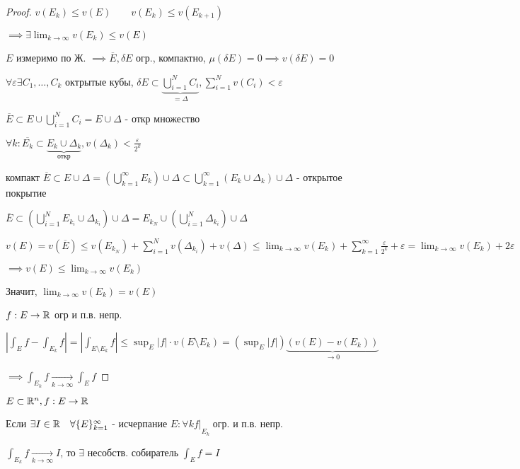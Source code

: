     \begin{proof}
        $v(E_k) \le v(E)\qquad v(E_k) \le v(E_{k+1})$

        $\implies \exists \lim_{k\to\infty} v(E_k) \le v(E)$

        $E$ измеримо по Ж. $\implies \overline{E}, \delta E$ огр., компактно, 
        $\mu(\delta E) = 0 \implies v(\delta E) = 0$

        $\forall \varepsilon \exists C_1, \dotsc, C_k$  октрытые кубы, 
        $\delta E \subset \underbrace{\bigcup^N_{i=1}C_i}_{=\Delta}, \sum^N_{i=1}v(C_i) < \varepsilon$

        $\overline{E} \subset E \cup \bigcup^N_{i=1}C_i = E \cup \Delta$ - откр множество

        $\forall k: \overline{E_k} \subset \underbrace{E_k \cup \Delta_k}_{\text{откр}},  v(\Delta_k) < \frac{\varepsilon}{2^k}$

        компакт $\overline{E} \subset E \cup \Delta = (\bigcup^\infty_{k=1}E_k)\cup \Delta \subset \bigcup^\infty_{k=1}(E_k \cup \Delta_k)\cup \Delta$ - открытое покрытие

        $\overline{E} \subset (\bigcup^N_{i=1}E_{k_i}\cup \Delta_{k_i}) \cup \Delta = 
        E_{k_N}\cup (\bigcup^N_{i=1}\Delta_{k_i})\cup \Delta$

        $\displaystyle v(E) = v(\overline{E}) \le v(E_{k_N}) + \sum^N_{i=1}v(\Delta_{k_i}) + v(\Delta) \le
        \lim_{k\to\infty} v(E_k) + \sum^\infty_{k=1}\frac{\varepsilon}{2^k} + \varepsilon = 
        \lim_{k\to\infty} v(E_k) + 2\varepsilon$

        $\implies v(E) \le \lim_{k \to \infty} v(E_k)$

        Значит, $\lim_{k\to\infty}v(E_k) = v(E)$

        $f: E \to \mathbb{R}$ огр и п.в. непр.

        $| \int_E f - \int_{E_k} f | = | \int_{E\setminus E_k} f | \le 
        \sup_E |f| \cdot v(E\setminus E_k) = (\sup_E |f |) \underbrace{(v(E) - v(E_k))}_{\to 0}$

        $\implies \int_{E_k} f \underset{k\to\infty}{\to} \int_E f$
    \end{proof}

    \begin{definition}
        $E \subset \mathbb{R}^n, f: E \to \mathbb{R}$

        Если $\exists I \in \mathbb{R} \quad \forall \{ E \}^\infty_{k=1}$ - исчерпание $E: \forall k f|\underset{E_k}{ }$ огр. и п.в. непр.

        $\int_{E_k} f \underset{k\to\infty}{\to} I$, то $\exists$ несобств. собиратель $\int_E f = I$
    \end{definition}


